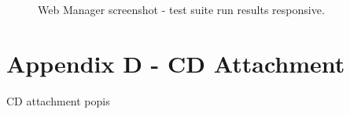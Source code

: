 \documentclass[11pt,oneside,final]{fithesis2}
\begin{document}
\begin{figure}[!htb]
    \begin{center}
    \leavevmode
    \centerline{}
    \end{center}
    \caption{Web Manager screenshot - test suite run results responsive.}
    \label{fig:webManagerTestSuiteRunResultsResponsive}
\end{figure}

\chapter{Appendix D - CD Attachment}
\label{appendix:d}
CD attachment popis
\end{document}
